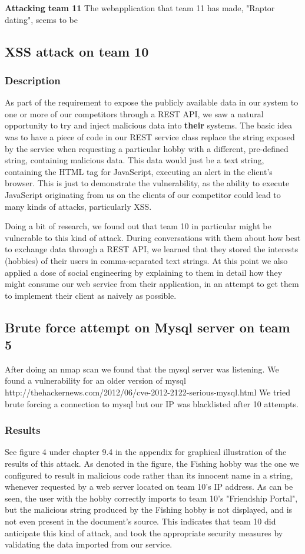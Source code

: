 \documentclass[a4paper]{article}
\begin{document}
\textbf{Attacking team 11}
The webapplication that team 11 has made, "Raptor dating", seems to be

\subsection{XSS attack on team 10}
\subsubsection{Description}
As part of the requirement to expose the publicly available data in our system to one or more of our competitors through a REST API, we saw a natural opportunity to try and inject malicious data into \textbf{their} systems. The basic idea was to have a piece of code in our REST service class replace the string exposed by the service when requesting a particular hobby with a different, pre-defined string, containing malicious data. This data would just be a text string, containing the HTML tag for JavaScript, executing an alert in the client's browser. This is just to demonstrate the vulnerability, as the ability to execute JavaScript originating from us on the clients of our competitor could lead to many kinds of attacks, particularly XSS.

Doing a bit of research, we found out that team 10 in particular might be vulnerable to this kind of attack. During conversations with them about how best to exchange data through a REST API, we learned that they stored the interests (hobbies) of their users in comma-separated text strings. At this point we also applied a dose of social engineering by explaining to them in detail how they might consume our web service from their application, in an attempt to get them to implement their client as naively as possible.

\subsection{Brute force attempt on Mysql server on team 5}
After doing an nmap scan we found that the mysql server was listening.
We found a vulnerability for an older version of mysql http://thehackernews.com/2012/06/cve-2012-2122-serious-mysql.html
We tried brute forcing a connection to mysql but our IP was blacklisted after 10 attempts.

\subsubsection{Results}
See figure 4 under chapter 9.4 in the appendix for graphical illustration of the results of this attack. As denoted in the figure, the Fishing hobby was the one we configured to result in malicious code rather than its innocent name in a string, whenever requested by a web server located on team 10's IP address. As can be seen, the user with the hobby correctly imports to team 10's "Friendship Portal", but the malicious string produced by the Fishing hobby is not displayed, and is not even present in the document's source. This indicates that team 10 did anticipate this kind of attack, and took the appropriate security measures by validating the data imported from our service.
\end{document}
